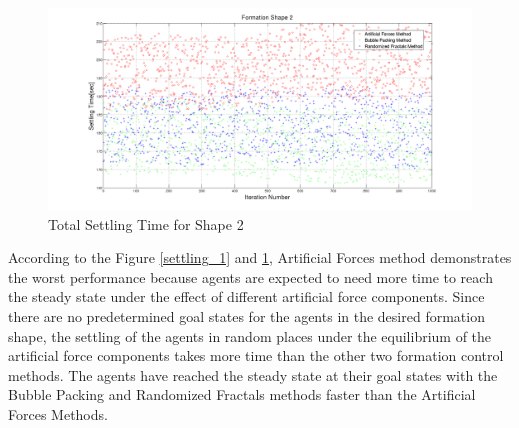 \begin{figure}[H]
\caption{Total Settling Time for Shape 2} \label{settling_2}
\centerline{\includegraphics[scale = 0.32]{Total_Time_Shape_2}}
\end{figure} 

According to the Figure \ref{settling_1} and \ref{settling_2}, Artificial Forces method demonstrates the worst performance because agents are expected to need more time to reach the steady state under the effect of different artificial force components. Since there are no predetermined goal states for the agents in the desired formation shape, the settling of the agents in random places under the equilibrium of the artificial force components takes more time than the other two formation control methods. The agents have reached the steady state at their goal states with the Bubble Packing and Randomized Fractals methods faster than the Artificial Forces Methods. 

